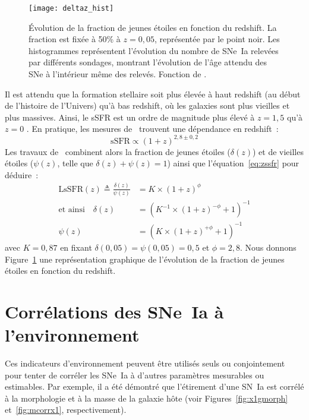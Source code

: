 \documentclass[../main/main.tex]{subfiles}
\begin{document}
\begin{figure}[t]
    \centering
    \texttt{[image: deltaz\_hist]}
    \caption[Évolution de la fraction de jeunes étoiles en fonction du
    redshift]{Évolution de la fraction de jeunes étoiles en fonction du
        redshift. La fraction est fixée à 50\% à $z=0,05$, représentée par le
        point noir. Les histogrammes représentent l'évolution du nombre de
        SNe~Ia relevées par différents sondages, montrant l'évolution de l'âge
    attendu des SNe à l'intérieur même des relevés. Fonction de
    \cite{rigault2020}.}
    \label{fig:deltaz}
\end{figure}

Il est attendu que la formation stellaire soit plus élevée à haut redshift (au
début de l'histoire de l'Univers) qu'à bas redshift, où les galaxies sont plus
vieilles et plus massives. Ainsi, le sSFR est un ordre de magnitude plus élevé à
$z = 1,5$ qu'à $z = 0$ \citep[voir][pour une étude complète]{madau2015}. En
pratique, les mesures de~\cite{tasca2015} trouvent une dépendance en redshift~:
\begin{equation}\label{eq:zssfr}
    \mathrm{sSFR} \propto (1+z)^{2,8 \pm 0,2}
\end{equation}
Les travaux de~\cite{rigault2020} combinent alors la fraction de jeunes étoiles
($\delta(z)$) et de vieilles étoiles ($\psi(z)$, telle que $\delta(z) + \psi(z)
= 1$) ainsi que l'équation~\ref{eq:zssfr} pour déduire~:
\begin{align}\label{eq:dpz}
    \mathrm{LsSFR}(z) \triangleq \frac{\delta(z)}{\psi(z)} &=
    K\times(1+z)^{\phi} \\\label{eq:deltaz}
    \text{et ainsi}\quad
    \delta(z) & = \left( K^{-1}\times(1+z)^{-\phi} +1 \right)^{-1}
    \\\label{eq:psiz}
    \psi(z)   & = \left( K\times(1+z)^{+\phi} +1 \right)^{-1}
\end{align}
avec $K=0,87$ en fixant $\delta(0,05) = \psi(0,05) = 0,5$ et $\phi = 2,8$. Nous
donnons Figure~\ref{fig:deltaz} une représentation graphique de l'évolution de
la fraction de jeunes étoiles en fonction du redshift.

\section{Corrélations des SNe~Ia à l'environnement}\label{sec:envcorr}

Ces indicateurs d'environnement peuvent être utilisés seuls ou conjointement
pour tenter de corréler les SNe~Ia à d'autres paramètres mesurables ou
estimables. Par exemple, il a été démontré que l'étirement d'une SN~Ia est
corrélé à la morphologie et à la masse de la galaxie hôte (voir
Figures~\ref{fig:x1gmorph} et~\ref{fig:mcorrx1}, respectivement).
\end{document}
